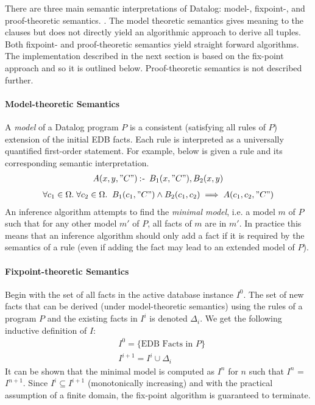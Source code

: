 There are three main semantic interpretations of Datalog: model-, fixpoint-, and proof-theoretic semantics. \cite{Green:2013:DRQ:2688167.2688168}. The model theoretic semantics gives meaning to the clauses but does not directly yield an algorithmic approach to derive all tuples. Both fixpoint- and proof-theoretic semantics yield straight forward algorithms. The implementation described in the next section is based on the fix-point approach and so it is outlined below. Proof-theoretic semantics is not described further.

\paragraph{Model-theoretic Semantics}\NL
A \textit{model} of a Datalog program $P$ is a consistent (satisfying all rules of $P$) extension of the initial EDB facts. Each rule is interpreted as a universally quantified first-order statement. For example, below is given a rule and its corresponding semantic interpretation. 
\begin{align*}
A(x, y, "C") \mathbin{:\hspace{-0.5ex}\textsf{-}} \;B_1(x, "C"), B_2(x, y)
\end{align*}
\begin{align*}
\forall c_1 \in \Omega.\;\forall c_2 \in \Omega.\;\; B_1(c_1, "C") \land B_2(c_1,c_2) \implies  A(c_1, c_2, "C")
\end{align*}
An inference algorithm attempts to find the \textit{minimal model}, i.e. a model $m$ of $P$ such that for any other model $m'$ of $P$, all facts of $m$ are in $m'$. In practice this means that an inference algorithm should only add a fact if it is required by the semantics of a rule (even if adding the fact may lead to an extended model of $P$). 

\paragraph{Fixpoint-theoretic Semantics}\NL
Begin with the set of all facts in the active database instance $I^0$. The set of new facts that can be derived (under model-theoretic semantics) using the rules of a program $P$ and the existing facts in $I^i$ is denoted $\Delta_i$. We get the following inductive definition of $I$:
\begin{align*}
&I^0 = \{ \text{EDB Facts in } P \}\\
&I^{i + 1} = I^i \cup \Delta_i 
\end{align*}
It can be shown\cite{Green:2013:DRQ:2688167.2688168} that the minimal model is computed as $I^{n}$ for $n$ such that $I^{n}$ = $I^{n + 1}$. Since $I^i \subseteq I^{i + 1}$ (monotonically increasing) and with the practical assumption of a finite domain, the fix-point algorithm is guaranteed to terminate.

